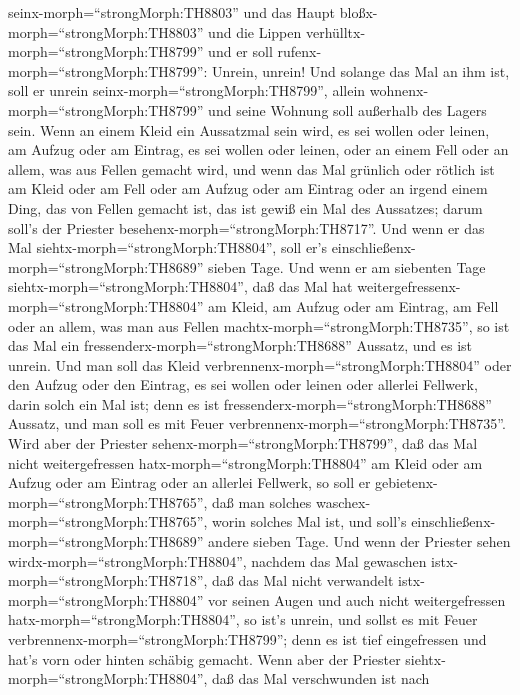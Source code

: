 seinx-morph=``strongMorph:TH8803'' und das Haupt
bloßx-morph=``strongMorph:TH8803'' und die Lippen
verhülltx-morph=``strongMorph:TH8799'' und er soll
rufenx-morph=``strongMorph:TH8799'': Unrein, unrein!  Und
solange das Mal an ihm ist, soll er unrein
seinx-morph=``strongMorph:TH8799'', allein
wohnenx-morph=``strongMorph:TH8799'' und seine Wohnung soll außerhalb
des Lagers sein.  Wenn an einem Kleid ein Aussatzmal sein
wird, es sei wollen oder leinen,  am Aufzug oder am
Eintrag, es sei wollen oder leinen, oder an einem Fell oder an allem,
was aus Fellen gemacht wird,  und wenn das Mal grünlich
oder rötlich ist am Kleid oder am Fell oder am Aufzug oder am Eintrag
oder an irgend einem Ding, das von Fellen gemacht ist, das ist gewiß ein
Mal des Aussatzes; darum soll's der Priester
besehenx-morph=``strongMorph:TH8717''.  Und wenn er das Mal
siehtx-morph=``strongMorph:TH8804'', soll er's
einschließenx-morph=``strongMorph:TH8689'' sieben Tage. 
Und wenn er am siebenten Tage siehtx-morph=``strongMorph:TH8804'', daß
das Mal hat weitergefressenx-morph=``strongMorph:TH8804'' am Kleid, am
Aufzug oder am Eintrag, am Fell oder an allem, was man aus Fellen
machtx-morph=``strongMorph:TH8735'', so ist das Mal ein
fressenderx-morph=``strongMorph:TH8688'' Aussatz, und es ist unrein.
 Und man soll das Kleid
verbrennenx-morph=``strongMorph:TH8804'' oder den Aufzug oder den
Eintrag, es sei wollen oder leinen oder allerlei Fellwerk, darin solch
ein Mal ist; denn es ist fressenderx-morph=``strongMorph:TH8688''
Aussatz, und man soll es mit Feuer
verbrennenx-morph=``strongMorph:TH8735''.  Wird aber der
Priester sehenx-morph=``strongMorph:TH8799'', daß das Mal nicht
weitergefressen hatx-morph=``strongMorph:TH8804'' am Kleid oder am
Aufzug oder am Eintrag oder an allerlei Fellwerk,  so soll
er gebietenx-morph=``strongMorph:TH8765'', daß man solches
waschex-morph=``strongMorph:TH8765'', worin solches Mal ist, und soll's
einschließenx-morph=``strongMorph:TH8689'' andere sieben Tage.
 Und wenn der Priester sehen
wirdx-morph=``strongMorph:TH8804'', nachdem das Mal gewaschen
istx-morph=``strongMorph:TH8718'', daß das Mal nicht verwandelt
istx-morph=``strongMorph:TH8804'' vor seinen Augen und auch nicht
weitergefressen hatx-morph=``strongMorph:TH8804'', so ist's unrein, und
sollst es mit Feuer verbrennenx-morph=``strongMorph:TH8799''; denn es
ist tief eingefressen und hat's vorn oder hinten schäbig gemacht.
 Wenn aber der Priester
siehtx-morph=``strongMorph:TH8804'', daß das Mal verschwunden ist nach
